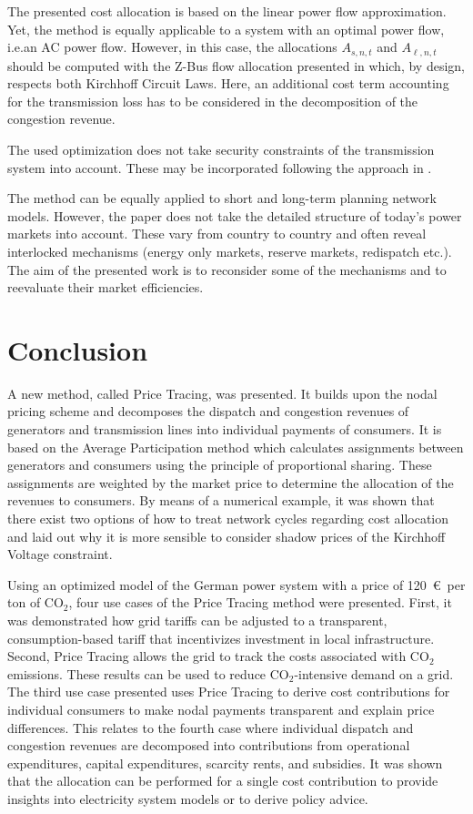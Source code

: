 \documentclass[11pt,twocolumn]{article}
\newcommand{\ie}{i.e.}
\newcommand{\allocategeneration}[1][s, n]{A_{#1,t}}
\newcommand{\allocateflow}[1][n]{A_{\ell,#1,t}}
\begin{document}
The presented cost allocation is based on the linear power flow approximation. Yet, the method is equally applicable to a system with an optimal power flow, \ie an \ac{AC} power flow. However, in this case, the allocations $\allocategeneration$ and $\allocateflow$ should be computed with the Z-Bus flow allocation presented in \cite{conejo_z-bus_2007} which, by design, respects both Kirchhoff Circuit Laws. Here, an additional cost term accounting for the transmission loss has to be considered in the decomposition of the congestion revenue.

The used optimization does not take security constraints of the transmission system into account. These may be incorporated following the approach in \cite{nikoukar_transmission_2012}.

The method can be equally applied to short and long-term planning network models. However, the paper does not take the detailed structure of today's power markets into account. These vary from country to country and often reveal interlocked mechanisms (energy only markets, reserve markets, redispatch etc.). The aim of the presented work is to reconsider some of the mechanisms and  to reevaluate their market efficiencies.


\section{Conclusion}
\label{sec:conclusions}

A new method, called Price Tracing, was presented. It builds upon the nodal pricing scheme and decomposes the dispatch and congestion revenues of generators and transmission lines into individual payments of consumers. It is based on the Average Participation method which calculates assignments between generators and consumers using the principle of proportional sharing. These assignments are weighted by the market price to determine the allocation of the revenues to consumers. By means of a numerical example, it was shown that there exist two options of how to treat network cycles regarding cost allocation and laid out why it is more sensible to consider shadow prices of the Kirchhoff Voltage constraint.

Using an optimized model of the German power system with a price of 120~\euro\, per ton of CO$_2$, four use cases of the Price Tracing method were presented. First, it was demonstrated how grid tariffs can be adjusted to a transparent, consumption-based tariff that incentivizes investment in local infrastructure. Second, Price Tracing allows the grid to track the costs associated with CO$_2$ emissions. These results can be used to reduce CO$_2$-intensive demand on a grid. The third use case presented uses Price Tracing to derive cost contributions for individual consumers to make nodal payments transparent and explain price differences. This relates to the fourth case where individual dispatch and congestion revenues are decomposed into contributions from operational expenditures, capital expenditures, scarcity rents, and subsidies. It was shown that the allocation can be performed for a single cost contribution to provide insights into electricity system models or to derive policy advice.
\end{document}
